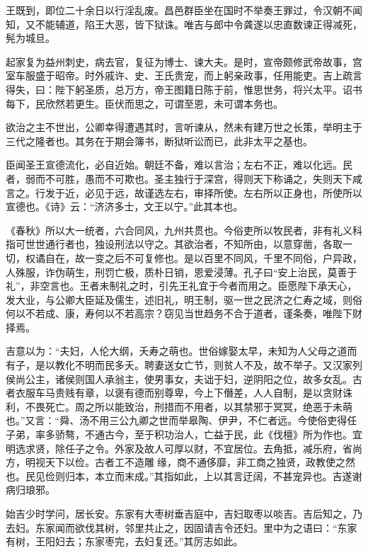 \documentclass[12pt,UTF8]{ctexbook}
\begin{document}
王既到，即位二十余日以行淫乱废。昌邑群臣坐在国时不举奏王罪过，令汉朝不闻知，又不能辅道，陷王大恶，皆下狱诛。唯吉与郎中令龚遂以忠直数谏正得减死，髡为城旦。



起家复为益州刺史，病去官，复征为博士、谏大夫。是时，宣帝颇修武帝故事，宫室车服盛于昭帝。时外戚许、史、王氏贵宠，而上躬亲政事，任用能吏。吉上疏言得失，曰：陛下躬圣质，总万方，帝王图籍日陈于前，惟思世务，将兴太平。诏书每下，民欣然若更生。臣伏而思之，可谓至恩，未可谓本务也。



欲治之主不世出，公卿幸得遭遇其时，言听谏从，然未有建万世之长策，举明主于三代之隆者也。其务在于期会簿书，断狱听讼而已，此非太平之基也。



臣闻圣王宣德流化，必自近始。朝廷不备，难以言治；左右不正，难以化远。民者，弱而不可胜，愚而不可欺也。圣主独行于深宫，得则天下称诵之，失则天下咸言之。行发于近，必见于远，故谨选左右，审择所使。左右所以正身也，所使所以宣德也。《诗》云：“济济多士，文王以宁。”此其本也。



《春秋》所以大一统者，六合同风，九州共贯也。今俗吏所以牧民者，非有礼义科指可世世通行者也，独设刑法以守之。其欲治者，不知所由，以意穿凿，各取一切，权谲自在，故一变之后不可复修也。是以百里不同风，千里不同俗，户异政，人殊服，诈伪萌生，刑罚亡极，质朴日销，恩爱浸薄。孔子曰“安上治民，莫善于礼”，非空言也。王者未制礼之时，引先王礼宜于今者而用之。臣愿陛下承天心，发大业，与公卿大臣延及儒生，述旧礼，明王制，驱一世之民济之仁寿之域，则俗何以不若成、康，寿何以不若高宗？窃见当世趋务不合于道者，谨条奏，唯陛下财择焉。



吉意以为：“夫妇，人伦大纲，夭寿之萌也。世俗嫁娶太早，未知为人父母之道而有子，是以教化不明而民多夭。聘妻送女亡节，则贫人不及，故不举子。又汉家列侯尚公主，诸侯则国人承翁主，使男事女，夫诎于妇，逆阴阳之位，故多女乱。古者衣服车马贵贱有章，以褒有德而别尊卑，今上下僭差，人人自制，是以贪财诛利，不畏死亡。周之所以能致治，刑措而不用者，以其禁邪于冥冥，绝恶于未萌也。”又言：“舜、汤不用三公九卿之世而举皋陶、伊尹，不仁者远。今使俗吏得任子弟，率多骄骜，不通古今，至于积功治人，亡益于民，此《伐檀》所为作也。宜明选求贤，除任子之令。外家及故人可厚以财，不宜居位。去角抵，减乐府，省尚方，明视天下以俭。古者工不造雕缘，商不通侈靡，非工商之独贤，政教使之然也。民见俭则归本，本立而末成。”其指如此，上以其言迂阔，不甚宠异也。吉遂谢病归琅邪。



始吉少时学问，居长安。东家有大枣树垂吉庭中，吉妇取枣以啖吉。吉后知之，乃去妇。东家闻而欲伐其树，邻里共止之，因固请吉令还妇。里中为之语曰：“东家有树，王阳妇去；东家枣完，去妇复还。”其厉志如此。
\end{document}

